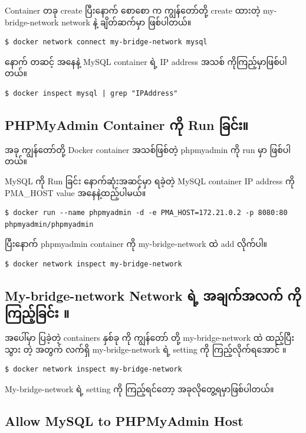 \documentclass{article}
\begin{document}
Container တခု create ပြီးနောက် စောစော က ကျွန်တော်တို့ create ထားတဲ့
my-bridge-network network နဲ့ ချိတ်ဆက်မှာ ဖြစ်ပါတယ်။

\begin{verbatim}
$ docker network connect my-bridge-network mysql
\end{verbatim}

နောက် တဆင့် အနေနဲ့ MySQL container ရဲ့ IP address အသစ်
ကိုကြည့်မှာဖြစ်ပါတယ်။

\begin{verbatim}
$ docker inspect mysql | grep "IPAddress"
\end{verbatim}

\subsection{PHPMyAdmin Container ကို Run
ခြင်း။}\label{phpmyadmin-container--run-}

အခု ကျွန်တော်တို့ Docker container အသစ်ဖြစ်တဲ့ phpmyadmin ကို run မှာ
ဖြစ်ပါတယ်။

MySQL ကို Run ခြင်း နောက်ဆုံးအဆင့်မှာ ရခဲ့တဲ့ MySQL container IP address
ကို PMA\_HOST value အနေနဲ့ထည့်ပါမယ်။

\begin{verbatim}
$ docker run --name phpmyadmin -d -e PMA_HOST=172.21.0.2 -p 8080:80 phpmyadmin/phpmyadmin
\end{verbatim}

ပြီးနောက် phpmyadmin container ကို my-bridge-network ထဲ add လိုက်ပါ။

\begin{verbatim}
$ docker network inspect my-bridge-network
\end{verbatim}

\subsection{My-bridge-network Network ရဲ့ အချက်အလက် ကိုကြည့်ခြင်း
။}\label{my-bridge-network-network---}

အပေါ်မှာ ပြခဲ့တဲ့ containers နှစ်ခု ကို ကျွန်တော် တို့ my-bridge-network
ထဲ ထည့်ပြီးသွား တဲ့ အတွက် လက်ရှိ my-bridge-network ရဲ့ setting ကို
ကြည့်လိုက်ရအောင် ။

\begin{verbatim}
$ docker network inspect my-bridge-network
\end{verbatim}

My-bridge-network ရဲ့ setting ကို ကြည့်ရင်တော့ အခုလိုတွေ့ရမှာဖြစ်ပါတယ်။

\subsection{Allow MySQL to PHPMyAdmin
Host}\label{allow-mysql-to-phpmyadmin-host}
\end{document}
